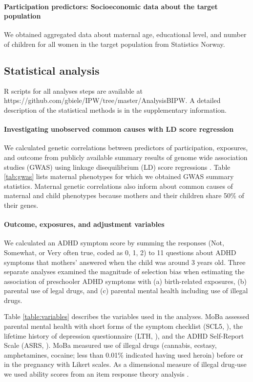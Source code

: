 \documentclass[12pt]{article}
\begin{document}
\paragraph{Participation predictors: Socioeconomic data about the target population}
We obtained aggregated data about maternal age, educational level, and number of children for all women in the target population from Statistics Norway. 


\subsection{Statistical analysis}
R scripts for all analyses steps are available at {\footnotesize https://github.com/gbiele/IPW/tree/master/AnalysisBIPW}. A detailed description of the statistical methods is in the supplementary information.

\paragraph{Investigating unobserved common causes with LD score regression} We calculated genetic correlations between predictors of participation, exposures, and outcome from publicly available summary results of genome wide association studies (GWAS) using linkage disequilibrium (LD) score regressions \cite{Bulik-Sullivan2015-er}. Table \ref{tab:gwas} lists maternal phenotypes for which we obtained GWAS summary statistics. Maternal genetic correlations also inform about common causes of maternal and child phenotypes because mothers and their children share 50\% of their genes.

\paragraph{Outcome, exposures, and adjustment variables} We calculated an ADHD symptom score by summing the responses (Not, Somewhat, or Very often true, coded as 0, 1, 2) to 11 questions about ADHD symptoms that mothers' answered when the child was around 3 years old. Three separate analyses examined the magnitude of selection bias when estimating the association of preschooler ADHD symptoms with (a) birth-related exposures, (b) parental use of legal drugs, and (c) parental mental health including use of illegal drugs. 

Table \ref{table:variables} describes the variables used in the analyses. MoBa assessed parental mental health with short forms of the symptom checklist (SCL5, \cite{Tambs1993-ch}), the lifetime history of depression questionnaire (LTH, \cite{Kendler1993-pf}), and the ADHD Self-Report Scale (ASRS, \cite{Kessler2007-et}). MoBa measured use of illegal drugs (cannabis, ecstasy, amphetamines, cocaine; less than 0.01\% indicated  having used heroin) before or in the pregnancy with Likert scales. As a dimensional measure of illegal drug-use we used ability scores from an item response theory analysis \cite{Rizopoulos2006-bc}. 
\end{document}
